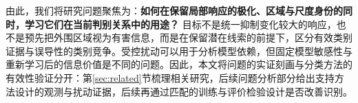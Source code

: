 由此，我们将研究问题聚焦为：\textbf{如何在保留局部响应的极化、区域与尺度身份的同时，学习它们在当前判别关系中的用途？} 目标不是统一抑制变化较大的响应，也不是预先把外围区域视为有害信息，而是在保留潜在线索的前提下，区分有效类别证据与误导性的类别竞争。受控扰动可以用于分析模型依赖，但固定模型敏感性与重新学习后的信息价值是不同的问题\cite{fong2017meaningful,hooker2019roar}。因此，本文将问题的实证刻画与分类方法的有效性验证分开：第\ref{sec:related}节梳理相关研究，后续问题分析部分给出支持方法设计的观测与扰动证据，后续再通过匹配的训练与评价检验设计是否改善识别。
